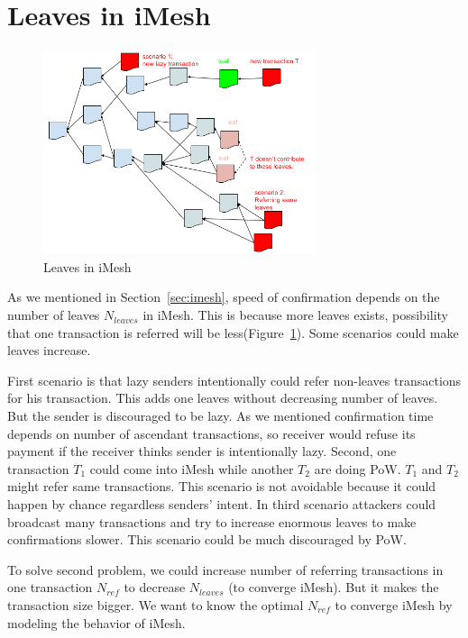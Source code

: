 \documentclass[a4paper,10pt,twocolumn]{article}
\begin{document}
\section{Leaves in iMesh}
\label{sec:leaves}

\begin{figure}[ht]
	\begin{center}
	\includegraphics[width=80mm]{leaves.png}
	  \caption{Leaves in iMesh}
    \label{fig:leaves}
	\end{center}
 \end{figure}

As we mentioned in Section~\ref{sec:imesh}, speed of confirmation
depends on the number of leaves \( N_{leaves} \) in iMesh. This is because more leaves exists,
possibility  that one transaction is referred  will be less(Figure~\ref{fig:leaves}).
Some scenarios could make leaves increase.

First scenario is that lazy senders intentionally could refer non-leaves transactions for his transaction.
This adds one leaves without decreasing number of leaves. But the sender is discouraged to be lazy.
As we mentioned confirmation time depends on number of ascendant transactions,
so receiver would refuse its payment if the receiver thinks sender is intentionally lazy.
Second, one transaction \(T_1\) could come into iMesh while another \(T_2\) are doing PoW.
\(T_1\) and \(T_2\) might refer same transactions.
This scenario is not avoidable because it could happen by chance regardless senders' intent.
In third scenario attackers could broadcast many transactions and try to increase enormous leaves to make confirmations slower.
This scenario could be much discouraged by PoW.

To solve second problem,
we could increase number of referring transactions in one transaction \( N_{ref} \) 
to decrease \( N _{leaves} \) (to converge iMesh). But it makes the transaction size bigger.
We want to know the optimal  \( N_{ref} \)  to converge iMesh by modeling the behavior of iMesh.
\end{document}
